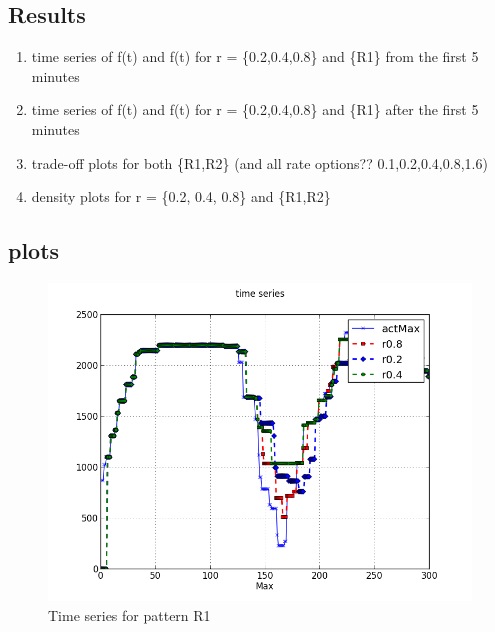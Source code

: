 \documentclass[a4paper, smallheadings,english]{scrartcl}
\begin{document}
\subsection{Results}
\begin{enumerate}
    \item time series of f(t) and f(t) for r = \{0.2,0.4,0.8\} and \{R1\} from the first 5 minutes
    \item time series of f(t) and f(t) for r = \{0.2,0.4,0.8\} and \{R1\} after the first 5 minutes
    \item trade-off plots for both \{R1,R2\} (and all rate options?? 0.1,0.2,0.4,0.8,1.6)
    \item density plots for r = \{0.2, 0.4, 0.8\} and \{R1,R2\}
\end{enumerate}
\subsection{plots}
\begin{figure}[h!]
    \begin{center}
        \includegraphics[scale=0.6]{plots/task1/time_series_R1}
    \end{center}
    \caption{Time series for pattern R1}
    \label{fig:task1_ts_r1}
\end{figure}
\end{document}
